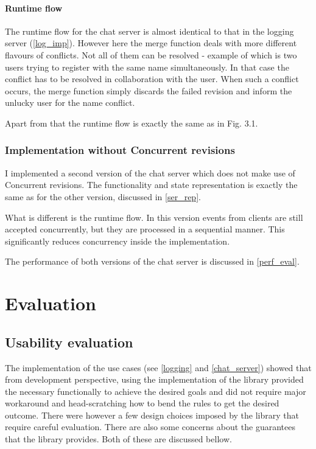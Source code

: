 \documentclass[12pt,twoside,notitlepage]{report}
\begin{document}
{\subsubsection{Runtime flow}

The runtime flow for the chat server is almost identical to that in the logging server (\ref{log_imp}). However here the merge function deals with more different flavours of conflicts. Not all of them can be resolved - example of which is two users trying to register with the same name simultaneously. In that case the conflict has to be resolved in collaboration with the user. When such a conflict occurs, the merge function simply discards the failed revision and inform the unlucky user for the name conflict. 

Apart from that the runtime flow is exactly the same as in Fig. 3.1.

\subsection{Implementation without Concurrent revisions}
I implemented a second version of the chat server which does not make use of Concurrent revisions. The functionality and state representation is exactly the same as for the other version, discussed in \ref{ser_rep}. 

What is different is the runtime flow. In this version events from clients are still accepted concurrently, but they are processed in a sequential manner. This significantly reduces concurrency inside the implementation. 

The performance of both versions of the chat server is discussed in \ref{perf_eval}.


\cleardoublepage
\chapter{Evaluation}

\section{Usability evaluation}
The implementation of the use cases (see \ref{logging} and \ref{chat_server}) showed that from development perspective, using the implementation of the library provided the necessary functionally to achieve the desired goals and did not require major workaround and head-scratching how to bend the rules to get the desired outcome. There were however a few design choices imposed by the library that require careful evaluation. There are also some concerns about the guarantees that the library provides. Both of these are discussed bellow.

}
\end{document}
